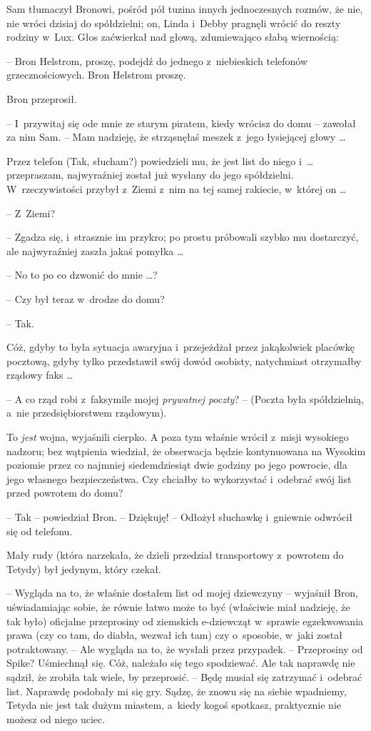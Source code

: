 \documentclass[oneside,polish,11pt,rmheadings]{mwbk}
\begin{document}
Sam tłumaczył Bronowi, pośród pół tuzina innych jednoczesnych rozmów, że nie, nie wróci dzisiaj do spółdzielni; on, Linda i~Debby pragnęli wrócić do reszty rodziny w~Lux. Głos zaćwierkał nad głową, zdumiewająco słabą wiernością: 

-- Bron Helstrom, proszę, podejdź do jednego z~niebieskich telefonów grzecznościowych. Bron Helstrom proszę.   

Bron przeprosił. 

-- I~przywitaj się ode mnie ze starym piratem, kiedy wrócisz do domu -- zawołał za nim Sam.  -- Mam nadzieję, że strząsnęłaś meszek z~jego łysiejącej głowy \ldots  

Przez telefon (Tak, słucham?) powiedzieli mu, że jest list do niego i~\ldots  przepraszam, najwyraźniej został już wysłany do jego spółdzielni. W~rzeczywistości przybył z~Ziemi z~nim na tej samej rakiecie, w~której on \ldots  

-- Z~Ziemi? 

-- Zgadza się, i~strasznie im przykro; po prostu próbowali szybko mu dostarczyć, ale najwyraźniej zaszła jakaś pomyłka \ldots  

-- No to po co dzwonić do mnie  \ldots ? 

-- Czy był teraz w~drodze do domu? 

-- Tak. 

Cóż, gdyby to była sytuacja awaryjna i~przejeżdżał przez jakąkolwiek placówkę pocztową, gdyby tylko przedstawił swój dowód osobisty, natychmiast otrzymałby rządowy faks \ldots  

-- A co rząd robi z~faksymile mojej \textit{prywatnej poczty}? -- (Poczta była spółdzielnią, a~nie przedsiębiorstwem rządowym).

To \textit{jest }wojna, wyjaśnili cierpko. A poza tym właśnie wrócił z~misji wysokiego nadzoru; bez wątpienia wiedział, że obserwacja będzie kontynuowana na Wysokim poziomie przez co najmniej siedemdziesiąt dwie godziny po jego powrocie, dla jego własnego bezpieczeństwa. Czy chciałby to wykorzystać i~odebrać swój list przed powrotem do domu? 

-- Tak -- powiedział Bron. -- Dziękuję! --  Odłożył słuchawkę i~gniewnie odwrócił się od telefonu. 

Mały rudy (która narzekała, że dzieli przedział transportowy z~powrotem do Tetydy) był jedynym, który czekał. 

-- Wygląda na to, że właśnie dostałem list od mojej dziewczyny -- wyjaśnił Bron, uświadamiając sobie, że równie łatwo może to być (właściwie miał nadzieję, że tak było) oficjalne przeprosiny od ziemskich e-dziewcząt w~sprawie egzekwowania prawa (czy co tam, do diabła, wezwał ich tam) czy o~sposobie, w~jaki został potraktowany. -- Ale wygląda na to,  że wysłali przez przypadek. -- Przeprosiny od Spike? Uśmiechnął się. Cóż, należało się tego spodziewać. Ale tak naprawdę nie sądził, że zrobiła tak wiele, by przeprosić. -- Będę musiał się zatrzymać i~odebrać list. Naprawdę podobały mi się gry. Sądzę, że znowu się na siebie wpadniemy, Tetyda nie jest tak dużym miastem, a~kiedy kogoś spotkasz, praktycznie nie możesz od niego uciec. 
\end{document}
